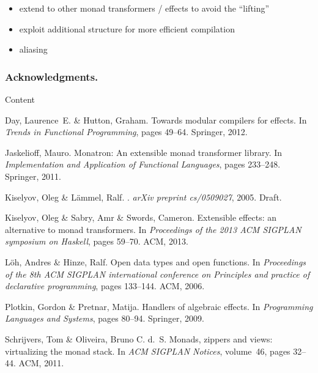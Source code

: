 \documentclass[runningheads,a4paper]{llncs}
\begin{document}
\begin{itemize}
\item extend to other monad transformers / effects to avoid the ``lifting''
\item exploit additional structure for more efficient compilation 
\item aliasing 
\end{itemize}

\subsubsection*{Acknowledgments.} Content

\begin{thebibliography}{4}

Day, Laurence~E. \& Hutton, Graham.
\newblock Towards modular compilers for effects.
\newblock In \emph{Trends in Functional Programming}, pages 49--64. Springer,
  2012.

Jaskelioff, Mauro.
\newblock Monatron: An extensible monad transformer library.
\newblock In \emph{Implementation and Application of Functional Languages},
  pages 233--248. Springer, 2011.
  
  Kiselyov, Oleg \& L{\"a}mmel, Ralf.
  .
  \newblock \emph{arXiv preprint cs/0509027}, 2005.
  \newblock Draft.

Kiselyov, Oleg \& Sabry, Amr \& Swords, Cameron.
\newblock Extensible effects: an alternative to monad transformers.
\newblock In \emph{Proceedings of the 2013 ACM SIGPLAN symposium on Haskell},
  pages 59--70. ACM, 2013.

L{\"o}h, Andres \& Hinze, Ralf.
\newblock Open data types and open functions.
\newblock In \emph{Proceedings of the 8th ACM SIGPLAN international conference
  on Principles and practice of declarative programming}, pages 133--144. ACM,
  2006.

Plotkin, Gordon \& Pretnar, Matija.
\newblock Handlers of algebraic effects.
\newblock In \emph{Programming Languages and Systems}, pages 80--94. Springer,
  2009.

Schrijvers, Tom \& Oliveira, Bruno C. d.~S.
\newblock Monads, zippers and views: virtualizing the monad stack.
\newblock In \emph{ACM SIGPLAN Notices}, volume~46, pages 32--44. ACM, 2011.


\end{thebibliography}
\end{document}
